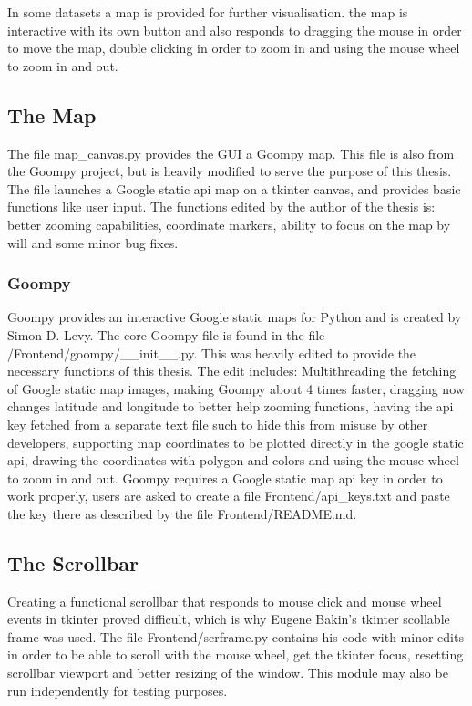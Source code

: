 In some datasets a map is provided for further visualisation. the map is interactive with its own button and also responds to dragging the mouse in order to move the map, double clicking in order to zoom in and using the mouse wheel to zoom in and out.

\subsection{The Map}
The file map\_canvas.py provides the GUI a Goompy\cite{goompy} map. This file is also from the Goompy project, but is heavily modified to serve the purpose of this thesis. The file launches a Google static api map on a tkinter canvas, and provides basic functions like user input. The functions edited by the author of the thesis is: better zooming capabilities, coordinate markers, ability to focus on the map by will and some minor bug fixes.

\subsubsection{Goompy}
Goompy\cite{goompy} provides an interactive Google static maps for Python and is created by Simon D. Levy.
The core Goompy file is found in the file /Frontend/goompy/\_\_init\_\_.py. This was heavily edited to provide the necessary functions of this thesis. The edit includes: Multithreading the fetching of Google static map images, making Goompy about 4 times faster, dragging now changes latitude and longitude to better help zooming functions, having the api key fetched from a separate text file such to hide this from misuse by other developers, supporting map coordinates to be plotted directly in the google static api, drawing the coordinates with polygon and colors and using the mouse wheel to zoom in and out. Goompy requires a Google static map api key in order to work properly, users are asked to create a file Frontend/api\_keys.txt and paste the key there as described by the file Frontend/README.md.

\subsection{The Scrollbar}
Creating a functional scrollbar that responds to mouse click and mouse wheel events in tkinter proved difficult, which is why Eugene Bakin's tkinter scollable\cite{scrframe} frame was used. The file Frontend/scrframe.py contains his code with minor edits in order to be able to scroll with the mouse wheel, get the tkinter focus, resetting scrollbar viewport and better resizing of the window. This module may also be run independently for testing purposes.





